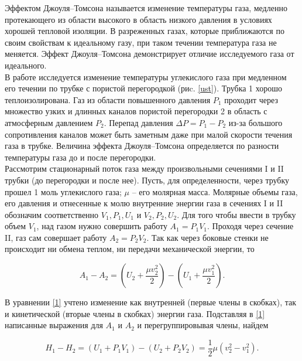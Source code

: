 \documentclass[a4paper, 12pt]{article}
\begin{document}
    \noindent Эффектом Джоуля–Томсона называется изменение температуры газа, медленно протекающего из области высокого в область низкого давления в условиях хорошей тепловой изоляции. В разреженных газах, которые приближаются по своим свойствам к идеальному газу, при таком течении температура газа не меняется. Эффект Джоуля–Томсона демонстрирует отличие исследуемого газа от идеального.\\

    \noindent В работе исследуется изменение температуры углекислого газа при медленном его течении по трубке с пористой перегородкой (риc. \ref{ust}). Трубка 1 хорошо теплоизолирована. Газ из области повышенного давления $P_1$ проходит через множество узких и длинных каналов пористой перегородки 2 в область с атмосферным давлением $P_2$. Перепад давления $\Delta P = P_1 - P_2$ из-за большого сопротивления каналов может быть заметным даже при малой скорости течения газа в трубке. Величина эффекта Джоуля–Томсона определяется по разности температуры газа до и после перегородки.\\

    \noindent Рассмотрим стационарный поток газа между произвольными сечениями I и II трубки (до перегородки и после нее). Пусть, для определенности, через трубку прошел 1 моль углекислого газа; $\mu$ -- его молярная масса. Молярные объемы газа, его давления и отнесенные к молю внутренние энергии газа в сечениях I и II обозначим соответственно $V_1, P_1, U_1 $ и $ V_2, P_2, U_2$. Для того чтобы ввести в трубку объем $V_1$, над газом нужно совершить работу $A_1 = P_1V_1$. Проходя через сечение II, газ сам совершает работу $A_2 = P_2V_2$. Так как через боковые стенки не происходит ни обмена теплом, ни передачи механической энергии, то

    \begin{equation}
        \label{1}
        A_1-A_2=\left(U_2+\frac{\mu v_2^2}{2}\right) - \left(U_1 + \frac{\mu v_1^2}{2}\right).
    \end{equation}

    \noindent В уравнении \eqref{1} учтено изменение как внутренней (первые члены в скобках), так и кинетической (вторые члены в скобках) энергии газа. Подставляя в \eqref{1} написанные выражения для $A_1$ и $A_2$ и перегруппировывая члены, найдем

    \begin{equation}
        \label{2}
        H_1-H_2=\left(U_1+P_1V_1\right) - \left(U_2 + P_2V_2\right) = \frac{1}{2} \mu \left(v^2_2-v^2_1\right).
    \end{equation}
\end{document}
